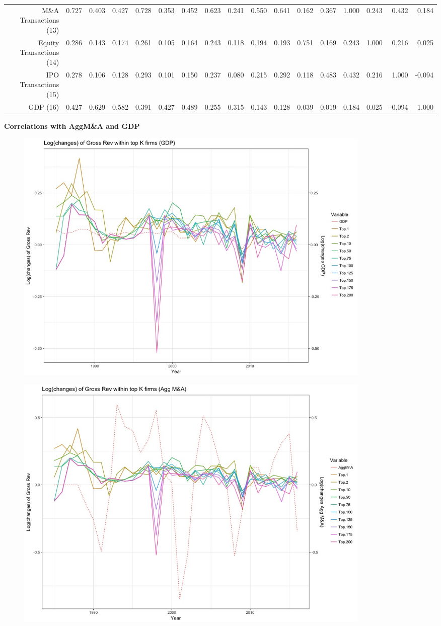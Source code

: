\documentclass{article}
\begin{document}
\begin{table}[H]
\begin{tabular}{rrrrrrrrrrrrrrrrr}
  M\&A Transactions (13) & 0.727 & 0.403 & 0.427 & 0.728 & 0.353 & 0.452 & 0.623 & 0.241 & 0.550 & 0.641 & 0.162 & 0.367 & 1.000 & 0.243 & 0.432 & 0.184 \\ 
  Equity Transactions (14) & 0.286 & 0.143 & 0.174 & 0.261 & 0.105 & 0.164 & 0.243 & 0.118 & 0.194 & 0.193 & 0.751 & 0.169 & 0.243 & 1.000 & 0.216 & 0.025 \\ 
  IPO Transactions (15) & 0.278 & 0.106 & 0.128 & 0.293 & 0.101 & 0.150 & 0.237 & 0.080 & 0.215 & 0.292 & 0.118 & 0.483 & 0.432 & 0.216 & 1.000 & -0.094 \\ 
  GDP (16) & 0.427 & 0.629 & 0.582 & 0.391 & 0.427 & 0.489 & 0.255 & 0.315 & 0.143 & 0.128 & 0.039 & 0.019 & 0.184 & 0.025 & -0.094 & 1.000 \\ 
   \hline
\end{tabular}
\end{table}

\newpage
{\large \textbf{Correlations with AggM\&A and GDP} }
\begin{figure}[H]\centering
\includegraphics[width=0.85\textwidth]{../IndivTexOutput/MnAGDP-01.jpg}\end{figure}

\begin{figure}[H]\centering
\includegraphics[width=0.85\textwidth]{../IndivTexOutput/MnAGDP-02.jpg}\end{figure}
\end{document}

